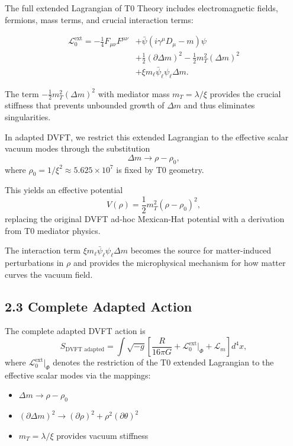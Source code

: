	The full extended Lagrangian of T0 Theory includes electromagnetic fields, fermions, mass terms, and crucial interaction terms:

\[
\begin{aligned}
	\mathcal{L}_0^{\text{ext}} = -\frac{1}{4} F_{\mu\nu}F^{\mu\nu} &+ \bar{\psi}(i\gamma^\mu D_\mu - m)\psi \\
	&+ \frac{1}{2}(\partial \Delta m)^2 - \frac{1}{2} m_T^2 (\Delta m)^2 \\
	&+ \xi m_\ell \bar{\psi}_\ell \psi_\ell \Delta m.
\end{aligned}
\]
	
	The term $-\frac{1}{2} m_T^2 (\Delta m)^2$ with mediator mass $m_T = \lambda / \xi$ provides the crucial stiffness that prevents unbounded growth of $\Delta m$ and thus eliminates singularities.
	
	In adapted DVFT, we restrict this extended Lagrangian to the effective scalar vacuum modes through the substitution
	\[
	\Delta m \to \rho - \rho_0,
	\]
	where $\rho_0 = 1/\xi^2 \approx 5.625 \times 10^7$ is fixed by T0 geometry.
	
	This yields an effective potential
	\[
	V(\rho) = \frac{1}{2} m_T^2 (\rho - \rho_0)^2,
	\]
	replacing the original DVFT ad-hoc Mexican-Hat potential with a derivation from T0 mediator physics.
	
	The interaction term $\xi m_\ell \bar{\psi}_\ell \psi_\ell \Delta m$ becomes the source for matter-induced perturbations in $\rho$ and provides the microphysical mechanism for how matter curves the vacuum field.
	
	\subsection{2.3 Complete Adapted Action}
	
	The complete adapted DVFT action is
	\[
	S_{\text{DVFT adapted}} = \int \sqrt{-g} \left[ \frac{R}{16\pi G} + \mathcal{L}_0^{\text{ext}} \big|_{\Phi} + \mathcal{L}_m \right] d^4x,
	\]
	where $\mathcal{L}_0^{\text{ext}} \big|_{\Phi}$ denotes the restriction of the T0 extended Lagrangian to the effective scalar modes via the mappings:
	\begin{itemize}
		\item $\Delta m \to \rho - \rho_0$
		\item $(\partial \Delta m)^2 \to (\partial \rho)^2 + \rho^2 (\partial \theta)^2$
		\item $m_T = \lambda / \xi$ provides vacuum stiffness
	\end{itemize}
	
